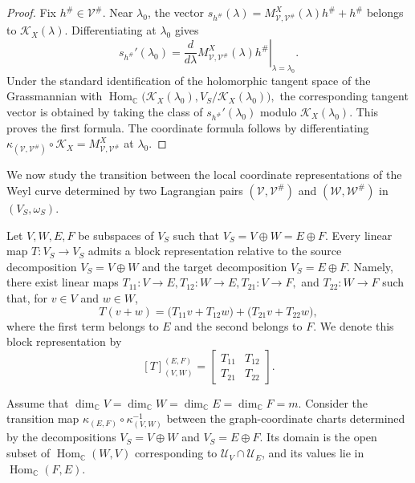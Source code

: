\documentclass[12pt]{amsart}
\theoremstyle{plain}
\theoremstyle{definition}
\theoremstyle{remark}
\numberwithin{equation}{section} \numberwithin{figure}{section}
\renewcommand*{\to}{\rightarrow}
\newcommand{\mb}[1]{\mathbb{#1}} %
\newcommand{\mc}[1]{\mathcal{#1}}
\begin{document}
\begin{proof}
Fix \(h^\#\in\mc V^\#\). Near \(\lambda_0\), the vector
\(
    s_{h^\#}(\lambda)
    =
    M_{\mc V,\mc V^\#}^X(\lambda)h^\#+h^\#
\)
belongs to \(\mc K_X(\lambda)\). Differentiating at \(\lambda_0\)
gives
\[
    s_{h^\#}'(\lambda_0)
    =
    \left.
    \frac{d}{d\lambda}
    M_{\mc V,\mc V^\#}^X(\lambda)h^\#
    \right|_{\lambda=\lambda_0}.
\]
Under the standard identification of the holomorphic tangent space of
the Grassmannian with
\(
    \operatorname{Hom}_{\mb C}
    \bigl(
        \mc K_X(\lambda_0),
        V_S/\mc K_X(\lambda_0)
    \bigr),
\)
the corresponding tangent vector is obtained by taking the class of
\(s_{h^\#}'(\lambda_0)\) modulo \(\mc K_X(\lambda_0)\). This proves
the first formula. The coordinate formula follows by differentiating
\(
    \kappa_{(\mc V,\mc V^\#)}\circ\mc K_X
    =
    M_{\mc V,\mc V^\#}^X
\)
at \(\lambda_0\).
\end{proof}

We now study the transition between the local coordinate
representations of the Weyl curve determined by two Lagrangian pairs
\((\mc V,\mc V^\#)\) and \((\mc W,\mc W^\#)\) in
\((V_S,\omega_S)\).

Let \(V,W,E,F\) be subspaces of \(V_S\) such that
\(
    V_S=V\oplus W=E\oplus F.
\)
Every linear map \(T:V_S\to V_S\) admits a block representation
relative to the source decomposition \(V_S=V\oplus W\) and the target
decomposition \(V_S=E\oplus F\). Namely, there exist linear maps
\(
    T_{11}:V\to E,
    T_{12}:W\to E,
    T_{21}:V\to F,
\)
and \(T_{22}:W\to F\) such that, for \(v\in V\) and \(w\in W\),
\[
    T(v+w)
    =
    \bigl(T_{11}v+T_{12}w\bigr)
    +
    \bigl(T_{21}v+T_{22}w\bigr),
\]
where the first term belongs to \(E\) and the second belongs to \(F\).
We denote this block representation by
\[
    [T]_{(V,W)}^{(E,F)}
    =
    \begin{bmatrix}
        T_{11} & T_{12}\\
        T_{21} & T_{22}
    \end{bmatrix}.
\]

Assume that
\(
    \dim_{\mb C}V
    =
    \dim_{\mb C}W
    =
    \dim_{\mb C}E
    =
    \dim_{\mb C}F
    =
    m.
\)
Consider the transition map
\(
    \kappa_{(E,F)}
    \circ
    \kappa_{(V,W)}^{-1}
\)
between the graph-coordinate charts determined by the decompositions
\(V_S=V\oplus W\) and \(V_S=E\oplus F\).
Its domain is the open subset of
\(\operatorname{Hom}_{\mb C}(W,V)\) corresponding to
\(\mc U_V\cap\mc U_E\), and its values lie in
\(\operatorname{Hom}_{\mb C}(F,E)\).
\end{document}
